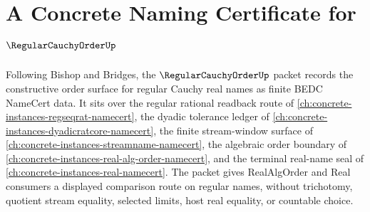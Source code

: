\chapter{A Concrete Naming Certificate for $\RegularCauchyOrderUp$}
\label{ch:concrete-instances-regular-cauchy-order-namecert}

Following Bishop and Bridges, the $\RegularCauchyOrderUp$ packet records the constructive order surface for regular Cauchy real names as finite BEDC NameCert data. It sits over the regular rational readback route of \autoref{ch:concrete-instances-regseqrat-namecert}, the dyadic tolerance ledger of \autoref{ch:concrete-instances-dyadicratcore-namecert}, the finite stream-window surface of \autoref{ch:concrete-instances-streamname-namecert}, the algebraic order boundary of \autoref{ch:concrete-instances-real-alg-order-namecert}, and the terminal real-name seal of \autoref{ch:concrete-instances-real-namecert}. The packet gives RealAlgOrder and Real consumers a displayed comparison route on regular names, without trichotomy, quotient stream equality, selected limits, host real equality, or countable choice.

